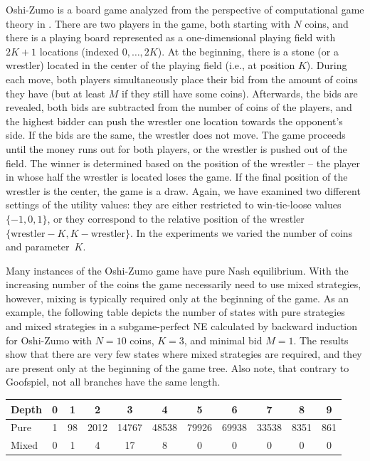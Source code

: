 Oshi-Zumo is a board game analyzed from the perspective of computational game theory in \cite{buro2003}.
There are two players in the game, both starting with $N$ coins, and there is a playing board represented as a one-dimensional playing field with $2K+1$ locations (indexed $0, \ldots, 2K$).
At the beginning, there is a stone (or a wrestler) located in the center of the playing field (i.e., at position $K$).
During each move, both players simultaneously place their bid from the amount of coins they have (but at least $M$ if they still have some coins).
Afterwards, the bids are revealed, both bids are subtracted from the number of coins of the players, and the highest bidder can push the wrestler one location towards the opponent's side.
If the bids are the same, the wrestler does not move. 
The game proceeds until the money runs out for both players, or the wrestler is pushed out of the field. 
The winner is determined based on the position of the wrestler -- the player in whose half the wrestler is located loses the game. 
If the final position of the wrestler is the center, the game is a draw.
Again, we have examined two different settings of the utility values: they are either restricted to win-tie-loose values $\lbrace -1, 0, 1 \rbrace$, or they correspond to the relative position of the wrestler $\lbrace \textrm{wrestler} - K, K - \textrm{wrestler} \rbrace$.
In the experiments we varied the number of coins and parameter~$K$.

Many instances of the Oshi-Zumo game have pure Nash equilibrium.
With the increasing number of the coins the game necessarily need to use mixed strategies, however, mixing is typically required only at the beginning of the game. 
As an example, the following table depicts the number of states with pure strategies and mixed strategies in a subgame-perfect NE calculated by backward induction for Oshi-Zumo with $N=10$ coins, $K=3$, and minimal bid $M=1$. The results show that there are very few states where mixed strategies are required, and they are present only at the beginning of the game tree. Also note, that contrary to Goofspiel, not all branches have the same length.

\vspace{0.1cm}

\begin{center}
\small
\begin{tabular}{|l|c|c|c|c|c|c|c|c|c|c|}
\hline Depth & 0 & 1 & 2 & 3 & 4 & 5 & 6 & 7 & 8 & 9\\
\hline Pure  & 1 & 98 & 2012 & 14767 & 48538 & 79926 & 69938 & 33538 & 8351 & 861\\
\hline Mixed & 0 &  1 &  4 &  17 & 8 & 0 & 0 & 0 & 0 & 0 \\
\hline
\end{tabular}
\end{center}

